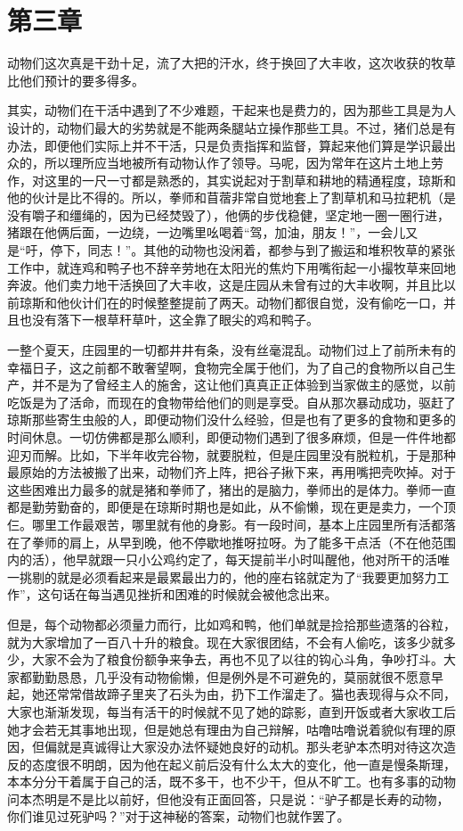 \chapter{第三章}

动物们这次真是干劲十足，流了大把的汗水，终于换回了大丰收，这次收获的牧草比他们预计的要多得多。

其实，动物们在干活中遇到了不少难题，干起来也是费力的，因为那些工具是为人设计的，动物们最大的劣势就是不能两条腿站立操作那些工具。不过，猪们总是有办法，即便他们实际上并不干活，只是负责指挥和监督，算起来他们算是学识最出众的，所以理所应当地被所有动物认作了领导。马呢，因为常年在这片土地上劳作，对这里的一尺一寸都是熟悉的，其实说起对于割草和耕地的精通程度，琼斯和他的伙计是比不得的。所以，拳师和苜蓿非常自觉地套上了割草机和马拉耙机（是没有嚼子和缰绳的，因为已经焚毁了），他俩的步伐稳健，坚定地一圈一圈行进，猪跟在他俩后面，一边绕，一边嘴里吆喝着“驾，加油，朋友！”，一会儿又是“吁，停下，同志！”。其他的动物也没闲着，都参与到了搬运和堆积牧草的紧张工作中，就连鸡和鸭子也不辞辛劳地在太阳光的焦灼下用嘴衔起一小撮牧草来回地奔波。他们卖力地干活换回了大丰收，这是庄园从未曾有过的大丰收啊，并且比以前琼斯和他伙计们在的时候整整提前了两天。动物们都很自觉，没有偷吃一口，并且也没有落下一根草秆草叶，这全靠了眼尖的鸡和鸭子。

一整个夏天，庄园里的一切都井井有条，没有丝毫混乱。动物们过上了前所未有的幸福日子，这之前都不敢奢望啊，食物完全属于他们，为了自己的食物所以自己生产，并不是为了曾经主人的施舍，这让他们真真正正体验到当家做主的感觉，以前吃饭是为了活命，而现在的食物带给他们的则是享受。自从那次暴动成功，驱赶了琼斯那些寄生虫般的人，即便动物们没什么经验，但是也有了更多的食物和更多的时间休息。一切仿佛都是那么顺利，即便动物们遇到了很多麻烦，但是一件件地都迎刃而解。比如，下半年收完谷物，就要脱粒，但是庄园里没有脱粒机，于是那种最原始的方法被搬了出来，动物们齐上阵，把谷子揪下来，再用嘴把壳吹掉。对于这些困难出力最多的就是猪和拳师了，猪出的是脑力，拳师出的是体力。拳师一直都是勤劳勤奋的，即便是在琼斯时期也是如此，从不偷懒，现在更是卖力，一个顶仨。哪里工作最艰苦，哪里就有他的身影。有一段时间，基本上庄园里所有活都落在了拳师的肩上，从早到晚，他不停歇地推呀拉呀。为了能多干点活（不在他范围内的活），他早就跟一只小公鸡约定了，每天提前半小时叫醒他，他对所干的活唯一挑剔的就是必须看起来是最累最出力的，他的座右铭就定为了“我要更加努力工作”，这句话在每当遇见挫折和困难的时候就会被他念出来。

但是，每个动物都必须量力而行，比如鸡和鸭，他们单就是捡拾那些遗落的谷粒，就为大家增加了一百八十升的粮食。现在大家很团结，不会有人偷吃，该多少就多少，大家不会为了粮食份额争来争去，再也不见了以往的钩心斗角，争吵打斗。大家都勤勤恳恳，几乎没有动物偷懒，但是例外是不可避免的，莫丽就很不愿意早起，她还常常借故蹄子里夹了石头为由，扔下工作溜走了。猫也表现得与众不同，大家也渐渐发现，每当有活干的时候就不见了她的踪影，直到开饭或者大家收工后她才会若无其事地出现，但是她总有理由为自己辩解，咕噜咕噜说着貌似有理的原因，但偏就是真诚得让大家没办法怀疑她良好的动机。那头老驴本杰明对待这次造反的态度很不明朗，因为他在起义前后没有什么太大的变化，他一直是慢条斯理，本本分分干着属于自己的活，既不多干，也不少干，但从不旷工。也有多事的动物问本杰明是不是比以前好，但他没有正面回答，只是说：“驴子都是长寿的动物，你们谁见过死驴吗？”对于这神秘的答案，动物们也就作罢了。

